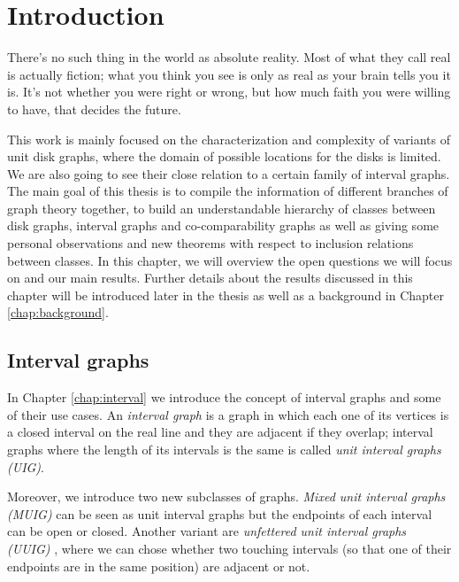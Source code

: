 \newtheorem*{_lemma}{Lemma}
\newtheorem*{_obs}{Observation}
\newtheorem*{_theo}{Theorem}

\chapter{Introduction}

\begin{fquote}
  There’s no such thing in the world as absolute reality. Most of what they call real is actually fiction; what you think you see is only as real as your brain tells you it is. It’s not whether you were right or wrong, but how much faith you were willing to have, that decides the future.
\end{fquote}


This work is mainly focused on the characterization and complexity of variants of unit disk graphs, where the domain of possible locations for the disks is limited. We are also going to see their close relation to a certain family of interval graphs. The main goal of this thesis is to compile the information of different branches of graph theory together, to build an understandable hierarchy of classes between disk graphs, interval graphs and co-comparability graphs as well as giving some personal observations and new theorems with respect to inclusion relations between classes. In this chapter, we will overview the open questions we will focus on and our main results. Further details about the results discussed in this chapter will be introduced later in the thesis as well as a background in Chapter \ref{chap:background}.

\section*{Interval graphs}

In Chapter \ref{chap:interval} we introduce the concept of interval graphs and some of their use cases. An \emph{interval graph} is a graph in which each one of its vertices is a closed interval on the real line and they are adjacent if they overlap; interval graphs where the length of its intervals is the same is called \emph{unit interval graphs (UIG)}.

Moreover, we introduce two new subclasses of graphs. \emph{Mixed unit interval graphs (MUIG)} \cite{joosCharacterizationMixedUnit2013} can be seen as unit interval graphs but the endpoints of each interval can be open or closed. Another variant are \emph{unfettered unit interval graphs (UUIG)} \cite{hayashiThinStripGraphs2017}, where we can chose whether two touching intervals (so that one of their endpoints are in the same position) are adjacent or not.

